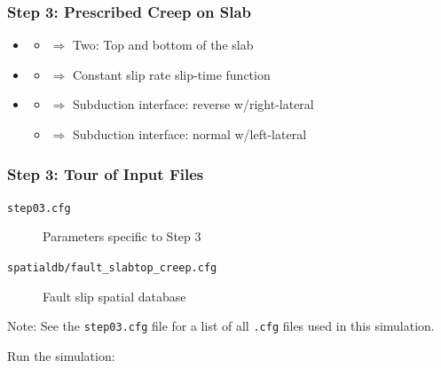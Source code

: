 \documentclass[aspectratio=169]{beamer}
\begin{document}
\begin{frame}
  \frametitle{Step 3: Prescribed Creep on Slab}
  \summary{}

  \begin{itemize}
  \item {}\pause
    \begin{itemize}
    \item $\Rightarrow$ Two: Top and bottom of the slab\pause
    \end{itemize}
  \item {}\pause
    \begin{itemize}
    \item $\Rightarrow$ Constant slip rate slip-time function\pause
    \end{itemize}
  \item {}\pause
    \begin{itemize}
    \item $\Rightarrow$ Subduction interface: reverse w/right-lateral\pause
    \item $\Rightarrow$ Subduction interface: normal w/left-lateral
    \end{itemize}
  \end{itemize}
  
\end{frame}


\begin{frame}
  \frametitle{Step 3: Tour of Input Files}
  \summary{}

  \begin{description}
  \item[{\tt step03.cfg}] Parameters specific to Step 3
  \item[{\tt spatialdb/fault\_slabtop\_creep.cfg}] Fault slip spatial database
  \end{description}
  
  \vfill
  Note: See the {\tt step03.cfg} file for a list of all {\tt .cfg}
  files used in this simulation.
  \vfill

  Run the simulation:\\

\end{frame}
\end{document}
